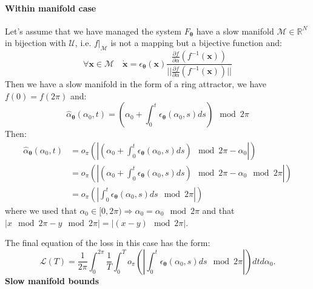 \documentclass{article} %
\newcounter{ct}
\newcommand{\manifold}{\mathcal{M}}
\theoremstyle{definition}
\theoremstyle{remark}
\begin{document}
\paragraph{Within manifold case}
Let's assume that we have managed the system \(F_{\boldsymbol{\theta}}\)  have a slow manifold \(\manifold \in \mathbb{R}^{N}\) in bijection with \(\mathcal{U}\), i.e. \(f|_{\manifold}\) is not a mapping but a bijective function and:
\begin{equation}
\forall \bm{x} \in \manifold \quad \dot{\bm{x}} = \epsilon_{\bm{\theta}}(\bm{x})\frac{\frac{\partial f}{\partial \alpha}(f^{-1}(\bm{x}))}{||\frac{\partial f}{\partial \alpha}(f^{-1}(\bm{x}))||}
\end{equation}
Then we have a slow manifold in the form of a ring attractor, we have \(f(0) = f(2 \pi)\) and:
\begin{equation}
    \hat{\alpha}_{\boldsymbol{\theta}}(\alpha_{0}, t) = \left(\alpha_{0} + \int_{0}^{t} \epsilon_{\bm{\theta}}(\alpha_{0}, s) ds \right)\mod 2 \pi
\end{equation}
Then:
\begin{equation}
\begin{split}
    \hat{\alpha}_{\boldsymbol{\theta}}(\alpha_{0}, t) &= o_{\pi} \left( \left| \left(\alpha_{0} + \int_{0}^{t} \epsilon_{\bm{\theta}}(\alpha_{0}, s) ds \right)\mod 2 \pi - \alpha_{0} \right| \right)  \\
    &= o_{\pi} \left( \left| \left(\alpha_{0} + \int_{0}^{t} \epsilon_{\bm{\theta}}(\alpha_{0}, s) ds \right)\mod 2 \pi - \alpha_{0} \mod 2 \pi \right| \right) \\
    &= o_{\pi} \left( \left| \int_{0}^{t} \epsilon_{\bm{\theta}}(\alpha_{0}, s) ds \mod 2 \pi \right| \right)
\end{split}
\end{equation}where we used that \(\alpha_{0} \in [0, 2 \pi) \Rightarrow \alpha_{0} = \alpha_{0} \mod 2 \pi\) and that \(|x \mod 2 \pi - y \mod 2 \pi| = |(x - y) \mod 2 \pi|\). %

The final equation of the loss in this case has the form:
\begin{equation}
    \mathcal{L}(T) =  \frac{1}{2 \pi} \int_{0}^{2 \pi} \frac{1}{T} \int_{0}^{T} o_{\pi} \left( \left| \int_{0}^{t} \epsilon_{\bm{\theta}}(\alpha_{0}, s) ds \mod 2 \pi \right| \right) dt d\alpha_{0}.
\end{equation}
\textbf{Slow manifold bounds}
\end{document}
